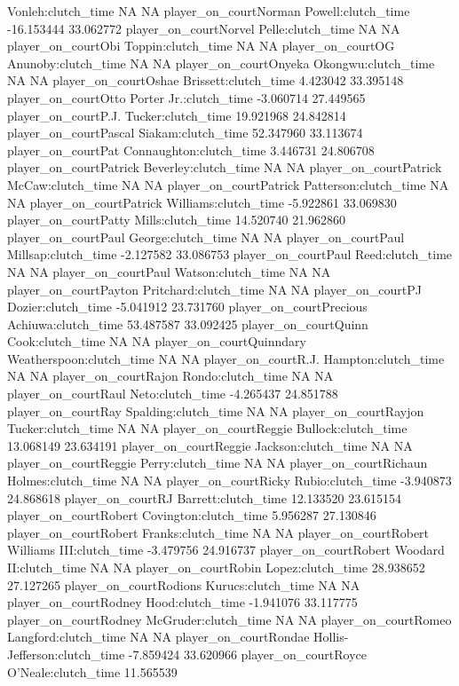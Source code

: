 \documentclass[
  landscape]{article}
\begin{document}
Vonleh:clutch\_time NA NA player\_on\_courtNorman Powell:clutch\_time
-16.153444 33.062772 player\_on\_courtNorvel Pelle:clutch\_time NA NA
player\_on\_courtObi Toppin:clutch\_time NA NA player\_on\_courtOG
Anunoby:clutch\_time NA NA player\_on\_courtOnyeka Okongwu:clutch\_time
NA NA player\_on\_courtOshae Brissett:clutch\_time 4.423042 33.395148
player\_on\_courtOtto Porter Jr.:clutch\_time -3.060714 27.449565
player\_on\_courtP.J. Tucker:clutch\_time 19.921968 24.842814
player\_on\_courtPascal Siakam:clutch\_time 52.347960 33.113674
player\_on\_courtPat Connaughton:clutch\_time 3.446731 24.806708
player\_on\_courtPatrick Beverley:clutch\_time NA NA
player\_on\_courtPatrick McCaw:clutch\_time NA NA
player\_on\_courtPatrick Patterson:clutch\_time NA NA
player\_on\_courtPatrick Williams:clutch\_time -5.922861 33.069830
player\_on\_courtPatty Mills:clutch\_time 14.520740 21.962860
player\_on\_courtPaul George:clutch\_time NA NA player\_on\_courtPaul
Millsap:clutch\_time -2.127582 33.086753 player\_on\_courtPaul
Reed:clutch\_time NA NA player\_on\_courtPaul Watson:clutch\_time NA NA
player\_on\_courtPayton Pritchard:clutch\_time NA NA player\_on\_courtPJ
Dozier:clutch\_time -5.041912 23.731760 player\_on\_courtPrecious
Achiuwa:clutch\_time 53.487587 33.092425 player\_on\_courtQuinn
Cook:clutch\_time NA NA player\_on\_courtQuinndary
Weatherspoon:clutch\_time NA NA player\_on\_courtR.J.
Hampton:clutch\_time NA NA player\_on\_courtRajon Rondo:clutch\_time NA
NA player\_on\_courtRaul Neto:clutch\_time -4.265437 24.851788
player\_on\_courtRay Spalding:clutch\_time NA NA player\_on\_courtRayjon
Tucker:clutch\_time NA NA player\_on\_courtReggie Bullock:clutch\_time
13.068149 23.634191 player\_on\_courtReggie Jackson:clutch\_time NA NA
player\_on\_courtReggie Perry:clutch\_time NA NA
player\_on\_courtRichaun Holmes:clutch\_time NA NA
player\_on\_courtRicky Rubio:clutch\_time -3.940873 24.868618
player\_on\_courtRJ Barrett:clutch\_time 12.133520 23.615154
player\_on\_courtRobert Covington:clutch\_time 5.956287 27.130846
player\_on\_courtRobert Franks:clutch\_time NA NA
player\_on\_courtRobert Williams III:clutch\_time -3.479756 24.916737
player\_on\_courtRobert Woodard II:clutch\_time NA NA
player\_on\_courtRobin Lopez:clutch\_time 28.938652 27.127265
player\_on\_courtRodions Kurucs:clutch\_time NA NA
player\_on\_courtRodney Hood:clutch\_time -1.941076 33.117775
player\_on\_courtRodney McGruder:clutch\_time NA NA
player\_on\_courtRomeo Langford:clutch\_time NA NA
player\_on\_courtRondae Hollis-Jefferson:clutch\_time -7.859424
33.620966 player\_on\_courtRoyce O'Neale:clutch\_time 11.565539
\end{document}
